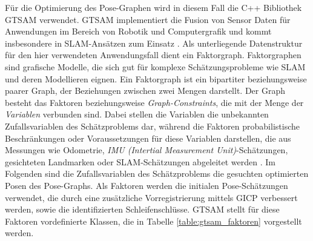 Für die Optimierung des Pose-Graphen wird in diesem Fall die C++ Bibliothek GTSAM \cite{dellaert2012factor} verwendet. GTSAM implementiert die Fusion von Sensor Daten für Anwendungen im Bereich von Robotik und Computergrafik und kommt insbesondere in SLAM-Ansätzen zum Einsatz \cite{dellaert2012factor}. Als unterliegende Datenstruktur für den hier verwendeten Anwendungsfall dient ein Faktorgraph. Faktorgraphen sind grafische Modelle, die sich gut für komplexe Schätzungsprobleme wie SLAM und deren Modellieren eignen. Ein Faktorgraph ist ein bipartiter beziehungsweise paarer Graph, der Beziehungen zwischen zwei Mengen darstellt. Der Graph besteht das Faktoren beziehungsweise \emph{Graph-Constraints}, die mit der Menge der \emph{Variablen} verbunden sind. Dabei stellen die Variablen die unbekannten Zufallsvariablen des Schätzproblems dar, während die Faktoren probabilistische Beschränkungen oder Voraussetzungen für diese Variablen darstellen, die aus Messungen wie Odometrie, \emph{IMU (Intertial Measurement Unit)}-Schätzungen, gesichteten Landmarken oder SLAM-Schätzungen abgeleitet werden \cite{dellaert2012factor}. Im Folgenden sind die Zufallsvariablen des Schätzproblems die gesuchten optimierten Posen des Pose-Graphs. Als Faktoren werden die initialen Pose-Schätzungen verwendet, die durch eine zusätzliche Vorregistrierung mittels GICP verbessert werden, sowie die identifizierten Schleifenschlüsse. GTSAM stellt für diese Faktoren vordefinierte Klassen, die in Tabelle \ref{table:gtsam_faktoren} vorgestellt werden.


